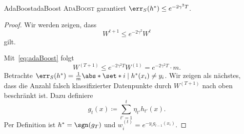 \documentclass[language=ngerman,algolist,acrolist]{TemplateLecture}
\begin{document}
\begin{thm}{\acs{AdaBoost}}{adaBoost}
    \textsc{\ac{AdaBoost}} garantiert $\err_S(h^*) \leq e^{-2\gamma^2 T}$.
\end{thm}
\begin{proof}
    Wir werden zeigen, dass 
    \begin{equation}
        W^{t + 1} \leq e^{-2\gamma^2} W^t \label{eq:adaBoost}
    \end{equation}
    gilt.

    Mit~\eqref{eq:adaBoost} folgt 
    \begin{equation*}
        W^{(T + 1)} \leq e^{-2\gamma^2 T} W^{(1)} = e^{-2\gamma^2 T} \cdot m.
    \end{equation*}
    Betrachte $\err_S(h^*) = \frac{1}{m} \abs*{\set*{i \mid h^*(x_i) \neq y_i}}$. Wir zeigen als nächstes, dass die Anzahl falsch klassifizierter Datenpunkte durch $W^{(T + 1)}$ nach oben beschränkt ist. Dazu definiere 
    \begin{equation*}
        g_t(x) \coloneqq \sum_{t' = 1}^t \eta_{t'} h_{t'}(x).
    \end{equation*}
    Per Definition ist $h^* = \sgn(g_T)$ und $w_i^{(t)} = e^{-y_i g_{t-1}(x_i)}$.


\end{proof}
\end{document}
